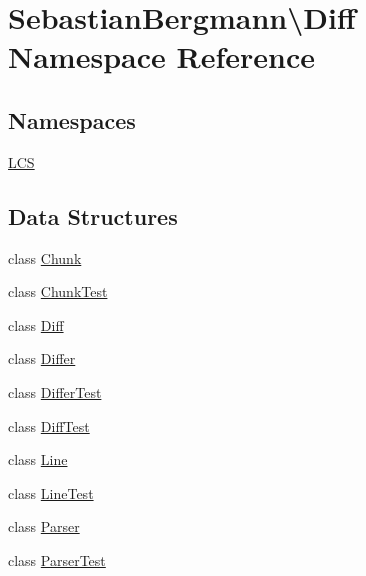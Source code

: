 \hypertarget{namespace_sebastian_bergmann_1_1_diff}{}\section{Sebastian\+Bergmann\textbackslash{}Diff Namespace Reference}
\label{namespace_sebastian_bergmann_1_1_diff}
\subsection*{Namespaces}
\begin{DoxyCompactItemize}
\item 
 \mbox{\hyperlink{namespace_sebastian_bergmann_1_1_diff_1_1_l_c_s}{L\+CS}}
\end{DoxyCompactItemize}
\subsection*{Data Structures}
\begin{DoxyCompactItemize}
\item 
class \mbox{\hyperlink{class_sebastian_bergmann_1_1_diff_1_1_chunk}{Chunk}}
\item 
class \mbox{\hyperlink{class_sebastian_bergmann_1_1_diff_1_1_chunk_test}{Chunk\+Test}}
\item 
class \mbox{\hyperlink{class_sebastian_bergmann_1_1_diff_1_1_diff}{Diff}}
\item 
class \mbox{\hyperlink{class_sebastian_bergmann_1_1_diff_1_1_differ}{Differ}}
\item 
class \mbox{\hyperlink{class_sebastian_bergmann_1_1_diff_1_1_differ_test}{Differ\+Test}}
\item 
class \mbox{\hyperlink{class_sebastian_bergmann_1_1_diff_1_1_diff_test}{Diff\+Test}}
\item 
class \mbox{\hyperlink{class_sebastian_bergmann_1_1_diff_1_1_line}{Line}}
\item 
class \mbox{\hyperlink{class_sebastian_bergmann_1_1_diff_1_1_line_test}{Line\+Test}}
\item 
class \mbox{\hyperlink{class_sebastian_bergmann_1_1_diff_1_1_parser}{Parser}}
\item 
class \mbox{\hyperlink{class_sebastian_bergmann_1_1_diff_1_1_parser_test}{Parser\+Test}}
\end{DoxyCompactItemize}
